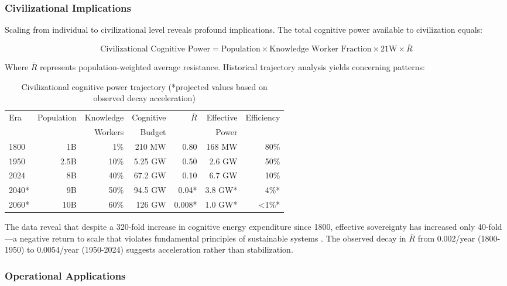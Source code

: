 \subsubsection{Civilizational Implications}

Scaling from individual to civilizational level reveals profound implications. The total cognitive power available to civilization equals:

\begin{equation}
\text{Civilizational Cognitive Power} = \text{Population} \times \text{Knowledge Worker Fraction} \times 21\text{W} \times \bar{R}
\end{equation}

Where $\bar{R}$ represents population-weighted average resistance. Historical trajectory analysis yields concerning patterns:

\begin{table}[h]
\centering
\begin{tabular}{|l|r|r|r|r|r|r|}
\hline
Era & Population & Knowledge & Cognitive & $\bar{R}$ & Effective & Efficiency \\
    &            & Workers   & Budget    &           & Power     &            \\
\hline
1800 & 1B & 1\% & 210 MW & 0.80 & 168 MW & 80\% \\
1950 & 2.5B & 10\% & 5.25 GW & 0.50 & 2.6 GW & 50\% \\
2024 & 8B & 40\% & 67.2 GW & 0.10 & 6.7 GW & 10\% \\
2040* & 9B & 50\% & 94.5 GW & 0.04* & 3.8 GW* & 4\%* \\
2060* & 10B & 60\% & 126 GW & 0.008* & 1.0 GW* & <1\%* \\
\hline
\end{tabular}
\caption{Civilizational cognitive power trajectory (*projected values based on observed decay acceleration)}
\end{table}

The data reveal that despite a 320-fold increase in cognitive energy expenditure since 1800, effective sovereignty has increased only 40-fold—a negative return to scale that violates fundamental principles of sustainable systems \citep{smil2019}. The observed decay in $\bar{R}$ from 0.002/year (1800-1950) to 0.0054/year (1950-2024) suggests acceleration rather than stabilization.

\subsubsection{Operational Applications}


